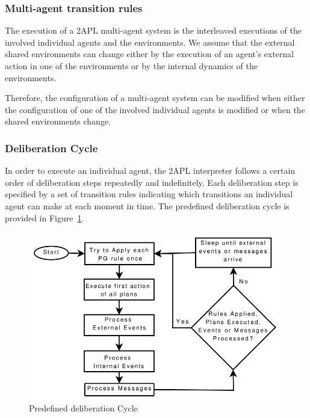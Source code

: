 \documentclass[a4paper]{article}
\begin{document}
\subsubsection{Multi-agent transition rules}

The execution of a 2APL multi-agent system is the interleaved executions of the involved individual agents and the environments. We assume that the external shared environments can change either by the execution of an agent's external action in one of the environments or by the internal dynamics of the environments.

Therefore, the configuration of a multi-agent system can be modified when either the configuration of one of the involved individual agents is modified or when the shared environments change.

\subsubsection{Deliberation Cycle} %

In order to execute an individual agent, the 2APL interpreter follows a certain order of deliberation steps repeatedly and indefinitely. Each deliberation step is specified by a set of transition rules indicating which transitions an individual agent can make at each moment in time. The predefined deliberation cycle is provided in Figure~\ref{fig:deliberation_cycle}.

\begin{figure}[htp]
\centering
\includegraphics[keepaspectratio,scale=0.35]{fig/rcycle.png}
\caption{Predefined deliberation Cycle}
\label{fig:deliberation_cycle}
\end{figure}
 
\end{document}
